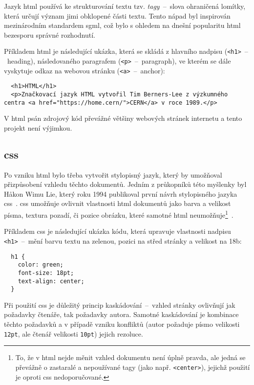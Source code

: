 \documentclass[a4paper, 12pt]{article}
\begin{document}
  Jazyk \gls{html} používá ke strukturování textu tzv. \emph{tagy}~--~slova ohraničená lomítky, která určují význam jimi obklopené části textu. Tento nápad byl inspirován mezinárodním standardem \gls{sgml}, což bylo s ohledem na dnešní popularitu \gls{html} bezesporu správné rozhodnutí.

  Příkladem \gls{html} je následující ukázka, která se skládá z hlavního nadpisu (\texttt{<h1>}~--~heading), následovaného paragrafem (\texttt{<p>}~--~paragraph), ve kterém se dále vyskytuje odkaz na webovou stránku (\texttt{<a>}~--~anchor):

  \begin{verbatim}
  <h1>HTML</h1>
  <p>Značkovací jazyk HTML vytvořil Tim Berners-Lee z výzkumného centra <a href="https://home.cern/">CERN</a> v roce 1989.</p>
  \end{verbatim}

  V \gls{html} psán zdrojový kód převážné většiny webových stránek internetu a tento projekt není výjimkou.


  \subsection{\acrshort{css}} \label{sec:CSS}
  Po vzniku \gls{html} bylo třeba vytvořit stylopisný jazyk, který by umožňoval přizpůsobení vzhledu těchto dokumentů. Jedním z průkopníků této myšlenky byl Håkon Wimu Lie, který roku 1994 publikoval první návrh stylopisného jazyka \gls{css}~\cite{css-proposal}. \gls{css} umožňuje ovlivnit vlastnosti \gls{html} dokumentů jako barva a velikost písma, textura pozadí, či pozice obrázku, které samotné \gls{html} neumožňuje\footnote{To, že v \gls{html} nejde měnit vzhled dokumentu není úplně pravda, ale jedná se převážně o zastaralé a nepoužívané tagy (jako např. \texttt{<center>}), jejichž použití je oproti \gls{css} nedoporučované.}~\cite{css-saga}.

  Příkladem \gls{css} je následující ukázka kódu, která upravuje vlastnosti nadpisu \texttt{<h1>}~--~mění barvu textu na zelenou, pozici na střed stránky a velikost na 18b:

  \begin{verbatim}
  h1 {
    color: green;
    font-size: 18pt;
    text-align: center;
  }
  \end{verbatim}

  Při použití \gls{css} je důležitý princip kaskádování~--~vzhled stránky ovlivňují jak požadavky čtenáře, tak požadavky autora. Samotné kaskádování je kombinace těchto požadavků a v případě vzniku konfliktů (autor požaduje písmo velikosti \texttt{12pt}, ale čtenář velikosti \texttt{10pt}) jejich rezoluce.
\end{document}
